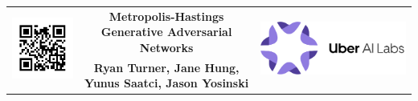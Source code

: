 \documentclass[a0,landscape]{a0poster}
\begin{document}


{
\setlength\extrarowheight{35pt}
\begin{tabular}{P{15cm}cP{15cm}}
&
{\fontsize{100}{120} \selectfont \color{NavyBlue} \textbf{Metropolis-Hastings Generative Adversarial Networks} \color{Black}}
&
 \\
&
\Huge \textbf{Ryan Turner, Jane Hung, Yunus Saatci, Jason Yosinski}
&
\end{tabular}
}
%
\vspace{2cm} %

\end{document}

